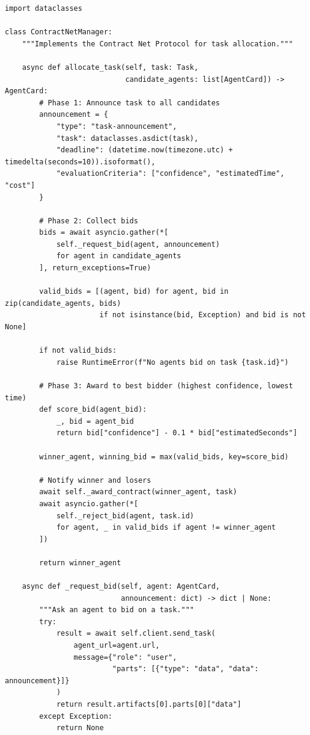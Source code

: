 \begin{examplebox}
\begin{lstlisting}[style=pythonstyle]
import dataclasses

class ContractNetManager:
    """Implements the Contract Net Protocol for task allocation."""

    async def allocate_task(self, task: Task,
                            candidate_agents: list[AgentCard]) -> AgentCard:
        # Phase 1: Announce task to all candidates
        announcement = {
            "type": "task-announcement",
            "task": dataclasses.asdict(task),
            "deadline": (datetime.now(timezone.utc) + timedelta(seconds=10)).isoformat(),
            "evaluationCriteria": ["confidence", "estimatedTime", "cost"]
        }

        # Phase 2: Collect bids
        bids = await asyncio.gather(*[
            self._request_bid(agent, announcement)
            for agent in candidate_agents
        ], return_exceptions=True)

        valid_bids = [(agent, bid) for agent, bid in zip(candidate_agents, bids)
                      if not isinstance(bid, Exception) and bid is not None]

        if not valid_bids:
            raise RuntimeError(f"No agents bid on task {task.id}")

        # Phase 3: Award to best bidder (highest confidence, lowest time)
        def score_bid(agent_bid):
            _, bid = agent_bid
            return bid["confidence"] - 0.1 * bid["estimatedSeconds"]

        winner_agent, winning_bid = max(valid_bids, key=score_bid)

        # Notify winner and losers
        await self._award_contract(winner_agent, task)
        await asyncio.gather(*[
            self._reject_bid(agent, task.id)
            for agent, _ in valid_bids if agent != winner_agent
        ])

        return winner_agent

    async def _request_bid(self, agent: AgentCard,
                           announcement: dict) -> dict | None:
        """Ask an agent to bid on a task."""
        try:
            result = await self.client.send_task(
                agent_url=agent.url,
                message={"role": "user",
                         "parts": [{"type": "data", "data": announcement}]}
            )
            return result.artifacts[0].parts[0]["data"]
        except Exception:
            return None
\end{lstlisting}
\end{examplebox}

